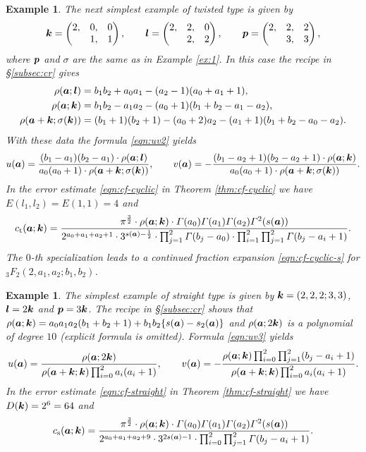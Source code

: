 \documentclass[a4paper,12pt]{article}
\theoremstyle{plain}
\newtheorem{example}[theorem]{Example}
\def\rs{\mathrm{s}}
\def\rt{\mathrm{t}}
\def\vG{\varGamma}
\def\ba{\mbox{\boldmath $a$}}
\def\sba{\mbox{\boldmath ${\scriptstyle a}$}}
\def\bk{\mbox{\boldmath $k$}}
\def\bl{\mbox{\boldmath $l$}}
\def\bp{\mbox{\boldmath $p$}}
\begin{document}
\begin{example} \label{ex:2} 
The next simplest example of twisted type is given by  
\[
\bk = \begin{pmatrix} 2, & 0, & 0 \\ & 1, & 1 \end{pmatrix}, \qquad 
\bl = \begin{pmatrix} 2, & 2, & 0 \\ & 2, & 2 \end{pmatrix}, \qquad 
\bp = \begin{pmatrix} 2, & 2, & 2 \\ & 3, & 3 \end{pmatrix},    
\]
where $\bp$ and $\sigma$ are the same as in Example \ref{ex:1}. 
In this case the recipe in \S\ref{subsec:cr} gives 
\begin{align*}
\rho(\ba; \bl) &= b_1 b_2 + a_0 a_1 - (a_2 - 1) (a_0 + a_1 + 1), \\
\rho(\ba; \bk) &= b_1 b_2 -a_1 a_2 - (a_0 + 1)(b_1+b_2 -a_1-a_2), \\ 
\rho(\ba+\bk; \sigma(\bk)) &= (b_1+1)(b_2+1)-(a_0+2)a_2-(a_1+1) (b_1+b_2-a_0-a_2).   
\end{align*}
With these data the formula \eqref{eqn:uv2} yields   
\[ 
u(\ba) = \frac{(b_1 - a_1) (b_2 - a_1) \cdot \rho(\ba; \bl) }{a_0 (a_0 + 1) \cdot 
\rho(\ba+\bk; \sigma(\bk)) }, \qquad 
v(\ba) = - \frac{(b_1 - a_2 + 1) (b_2 - a_2 + 1) \cdot 
\rho(\ba; \bk) }{a_0 (a_0 + 1) \cdot \rho(\ba+\bk; \sigma(\bk)) }. 
\]
In the error estimate \eqref{eqn:cf-cyclic} in Theorem \ref{thm:cf-cyclic} we have 
$E(l_1, l_2) = E(1,1) = 4$ and 
\[
c_{\rt}(\ba; \bk) = 
\dfrac{\pi^{\frac{3}{2}} \cdot \rho(\ba; \bk) \cdot \vG(a_0) \vG(a_1) \vG(a_2) 
\vG^2(s(\ba))}{2^{a_0+a_1+a_2+1} \cdot 3^{s(\sba) - \frac{1}{2}} \cdot 
\prod_{j=1}^2\vG(b_j-a_0) \cdot \prod_{i=1}^2 \prod_{j=1}^2 \vG(b_j-a_i+1)}. 
\]
The $0$-th specialization leads to a continued fraction expansion 
\eqref{eqn:cf-cyclic-s} for ${}_3F_2(2, a_1,a_2; b_1, b_2)$. 
\end{example}
\begin{example} \label{ex:3}
The simplest example of straight type is given by $\bk = (2,2,2; 3,3)$, 
$\bl = 2 \bk$ and $\bp = 3 \bk$. 
The recipe in \S \ref{subsec:cr} shows that 
$\rho(\ba; \bk) = a_0 a_1 a_2 (b_1+b_2+1) + b_1 b_2 \{s(\ba) - s_2(\ba) \}$ and   
$\rho(\ba; 2 \bk)$ is a polynomial of degree $10$ (explicit formula is omitted).  
Formula \eqref{eqn:uv3} yields 
\[
u(\ba) = \dfrac{\rho(\ba; 2 \bk)}{\rho(\ba+\bk; \bk) \prod_{i=0}^2 a_i(a_i+1)}, 
\qquad 
v(\ba) = - \dfrac{\rho(\ba; \bk) 
\prod_{i=0}^2 \prod_{j=1}^2 (b_j-a_i+1)}{\rho(\ba+\bk; \bk) \prod_{i=0}^2 a_i(a_i+1)}. 
\]
In the error estimate \eqref{eqn:cf-straight} in Theorem \ref{thm:cf-straight} 
we have $D(\bk) = 2^6 = 64$ and 
\[
c_{\rs}(\ba; \bk) = 
\dfrac{\pi^{\frac{3}{2}} \cdot \rho(\ba; \bk) \cdot \vG(a_0) \vG(a_1) \vG(a_2) 
\vG^2(s(\ba))}{2^{a_0+a_1+a_2+9} \cdot 3^{2 s(\sba) - 1} \cdot 
\prod_{i=0}^2 \prod_{j=1}^2 \vG(b_j-a_i+1)}. 
\]
\end{example} 


\end{document}
